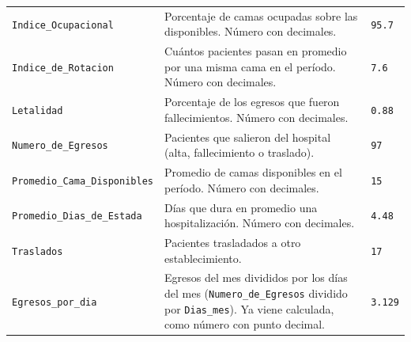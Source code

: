 \documentclass[10.5pt]{article}
\begin{document}
\begin{xltabular}{\linewidth}{@{}p{4.5cm} >{\raggedright\arraybackslash}X p{3.4cm}@{}}
\texttt{Indice\_\allowbreak{}Ocupacional} & Porcentaje de camas ocupadas sobre las disponibles. Número con decimales. & \texttt{95.7} \\
\texttt{Indice\_\allowbreak{}de\_\allowbreak{}Rotacion} & Cuántos pacientes pasan en promedio por una misma cama en el período. Número con decimales. & \texttt{7.6} \\
\texttt{Letalidad} & Porcentaje de los egresos que fueron fallecimientos. Número con decimales. & \texttt{0.88} \\
\texttt{Numero\_\allowbreak{}de\_\allowbreak{}Egresos} & Pacientes que salieron del hospital (alta, fallecimiento o traslado). & \texttt{97} \\
\texttt{Promedio\_\allowbreak{}Cama\_\allowbreak{}Disponibles} & Promedio de camas disponibles en el período. Número con decimales. & \texttt{15} \\
\texttt{Promedio\_\allowbreak{}Dias\_\allowbreak{}de\_\allowbreak{}Estada} & Días que dura en promedio una hospitalización. Número con decimales. & \texttt{4.48} \\
\texttt{Traslados} & Pacientes trasladados a otro establecimiento. & \texttt{17} \\
\texttt{Egresos\_\allowbreak{}por\_\allowbreak{}dia} & Egresos del mes divididos por los días del mes (\texttt{Numero\_\allowbreak{}de\_\allowbreak{}Egresos} dividido por \texttt{Dias\_\allowbreak{}mes}). Ya viene calculada, como número con punto decimal. & \texttt{3.129} \\
\end{xltabular}
\end{document}
